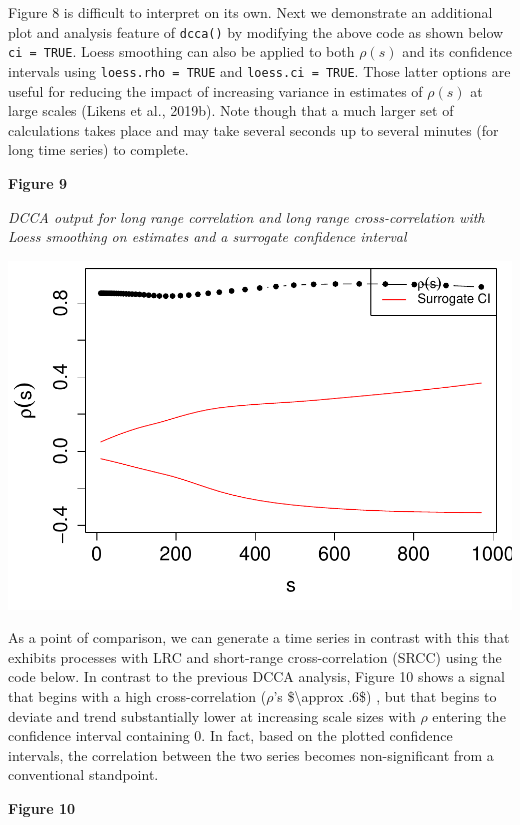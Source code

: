 \documentclass[
  man]{apa6}
\begin{document}
Figure 8 is difficult to interpret on its own. Next we demonstrate an
additional plot and analysis feature of \texttt{dcca()} by modifying the above
code as shown below \texttt{ci\ =\ TRUE}. Loess smoothing can also be applied to
both \(\rho(s)\) and its confidence intervals using \texttt{loess.rho\ =\ TRUE} and
\texttt{loess.ci\ =\ TRUE}. Those latter options are useful for reducing the
impact of increasing variance in estimates of \(\rho(s)\) at large scales
(Likens et al., 2019b). Note though that a much larger set of calculations takes
place and may take several seconds up to several minutes (for long time
series) to complete.

\textbf{Figure 9}

\emph{DCCA output for long range correlation and long range cross-correlation
with Loess smoothing on estimates and a surrogate confidence interval}

\includegraphics{fractal_regression_paper_brm_files/figure-latex/unnamed-chunk-18-1.pdf}

As a point of comparison, we can generate a time series in contrast with
this that exhibits processes with LRC and short-range cross-correlation
(SRCC) using the code below. In contrast to the previous DCCA analysis,
Figure 10 shows a signal that begins with a high cross-correlation
(\(\rho\)'s \$\textbackslash approx .6\$) , but that begins to deviate and trend
substantially lower at increasing scale sizes with \(\rho\) entering the
confidence interval containing 0. In fact, based on the plotted
confidence intervals, the correlation between the two series becomes
non-significant from a conventional standpoint.

\textbf{Figure 10}
\end{document}
